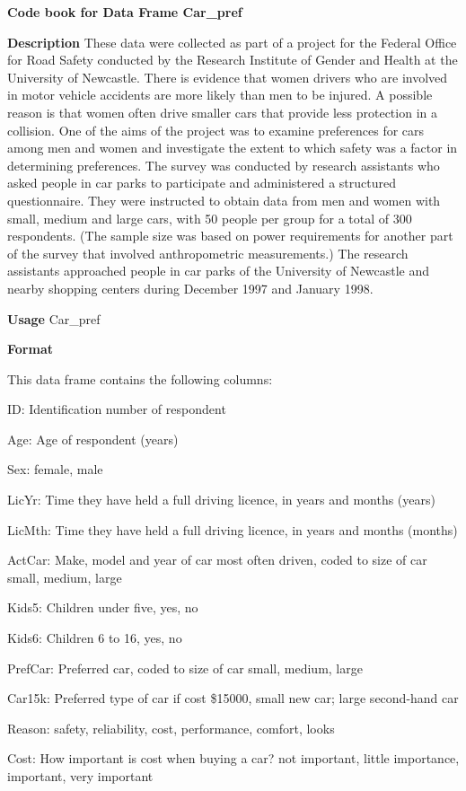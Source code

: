 \documentclass[
]{book}
\begin{document}
\textbf{Code book for Data Frame Car\_pref}

\textbf{Description}
These data were collected as part of a project for the Federal Office for Road Safety conducted by the Research Institute of Gender and Health at the University of Newcastle. There is evidence that women drivers who are involved in motor vehicle accidents are more likely than men to be injured. A possible reason is that women often drive smaller cars that provide less protection in a collision. One of the aims of the project was to examine preferences for cars among men and women and investigate the extent to which safety was a factor in determining preferences. The survey was conducted by research assistants who asked people in car parks to participate and administered a structured questionnaire. They were instructed to obtain data from men and women with small, medium and large cars, with 50 people per group for a total of 300 respondents. (The sample size was based on power requirements for another part of the survey that involved anthropometric measurements.) The research assistants approached people in car parks of the University of Newcastle and nearby shopping centers during December 1997 and January 1998.

\textbf{Usage}
Car\_pref

\textbf{Format}

This data frame contains the following columns:

ID: Identification number of respondent

Age: Age of respondent (years)

Sex: female, male

LicYr: Time they have held a full driving licence, in years and months (years)

LicMth: Time they have held a full driving licence, in years and months (months)

ActCar: Make, model and year of car most often driven, coded to size of car small, medium, large

Kids5: Children under five, yes, no

Kids6: Children 6 to 16, yes, no

PrefCar: Preferred car, coded to size of car small, medium, large

Car15k: Preferred type of car if cost \$15000, small new car; large second-hand car

Reason: safety, reliability, cost, performance, comfort, looks

Cost: How important is cost when buying a car? not important, little importance, important, very important
\end{document}
